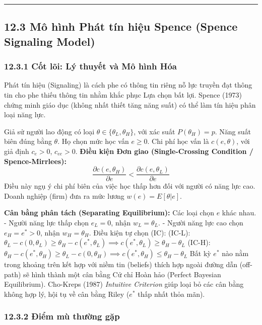 \documentclass[
]{article}
\begin{document}
\begin{center}\rule{0.5\linewidth}{0.5pt}\end{center}

\subsection{12.3 Mô hình Phát tín hiệu Spence (Spence Signaling
Model)}\label{muxf4-huxecnh-phuxe1t-tuxedn-hiux1ec7u-spence-spence-signaling-model}

\subsubsection{12.3.1 Cốt lõi: Lý thuyết và Mô hình
Hóa}\label{cux1ed1t-luxf5i-luxfd-thuyux1ebft-vuxe0-muxf4-huxecnh-huxf3a-2}

Phát tín hiệu (Signaling) là cách phe có thông tin riêng nỗ lực truyền
đạt thông tin cho phe thiếu thông tin nhằm khắc phục Lựa chọn bất lợi.
Spence (1973) chứng minh giáo dục (không nhất thiết tăng năng suất) có
thể làm tín hiệu phân loại năng lực.

Giả sử người lao động có loại \(\theta \in \{\theta_L, \theta_H\}\), với
xác suất \(P(\theta_H) = p\). Năng suất biên đúng bằng \(\theta\). Họ
chọn mức học vấn \(e \ge 0\). Chi phí học vấn là \(c(e, \theta)\), với
giả định \(c_e > 0\), \(c_{ee} > 0\). \textbf{Điều kiện Đơn giao
(Single-Crossing Condition / Spence-Mirrlees):}
\[ \frac{\partial c(e, \theta_H)}{\partial e} < \frac{\partial c(e, \theta_L)}{\partial e} \]
Điều này ngụ ý chi phí biên của việc học thấp hơn đối với người có năng
lực cao. Doanh nghiệp (firm) đưa ra mức lương \(w(e) = E[\theta | e]\).

\textbf{Cân bằng phân tách (Separating Equilibrium):} Các loại chọn
\(e\) khác nhau. - Người năng lực thấp chọn \(e_L = 0\), nhận
\(w_L = \theta_L\). - Người năng lực cao chọn \(e_H = e^* > 0\), nhận
\(w_H = \theta_H\). Điều kiện tự chọn (IC): (IC-L):
\(\theta_L - c(0, \theta_L) \ge \theta_H - c(e^*, \theta_L) \implies c(e^*, \theta_L) \ge \theta_H - \theta_L\)
(IC-H):
\(\theta_H - c(e^*, \theta_H) \ge \theta_L - c(0, \theta_H) \implies c(e^*, \theta_H) \le \theta_H - \theta_L\)
Bất kỳ \(e^*\) nào nằm trong khoảng trên kết hợp với niềm tin (beliefs)
thích hợp ngoài đường dẫn (off-path) sẽ hình thành một cân bằng Cử chỉ
Hoàn hảo (Perfect Bayesian Equilibrium). Cho-Kreps (1987)
\emph{Intuitive Criterion} giúp loại bỏ các cân bằng không hợp lý, hội
tụ về cân bằng Riley (\(e^*\) thấp nhất thỏa mãn).

\subsubsection{12.3.2 Điểm mù thường
gặp}\label{ux111iux1ec3m-muxf9-thux1b0ux1eddng-gux1eb7p-2}
\end{document}

